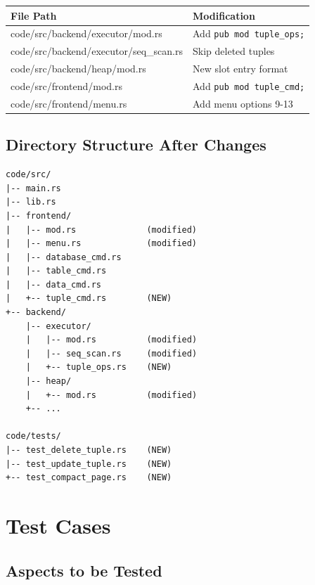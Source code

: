 \documentclass[11pt,a4paper]{article}
\begin{document}
\begin{table}[H]
\centering
\begin{tabular}{@{}ll@{}}
\toprule
\textbf{File Path} & \textbf{Modification} \\
\midrule
code/src/backend/executor/mod.rs & Add \texttt{pub mod tuple\_ops;} \\
code/src/backend/executor/seq\_scan.rs & Skip deleted tuples \\
code/src/backend/heap/mod.rs & New slot entry format \\
code/src/frontend/mod.rs & Add \texttt{pub mod tuple\_cmd;} \\
code/src/frontend/menu.rs & Add menu options 9-13 \\
\bottomrule
\end{tabular}
\end{table}

\subsection{Directory Structure After Changes}

\begin{lstlisting}
code/src/
|-- main.rs
|-- lib.rs
|-- frontend/
|   |-- mod.rs              (modified)
|   |-- menu.rs             (modified)
|   |-- database_cmd.rs
|   |-- table_cmd.rs
|   |-- data_cmd.rs
|   +-- tuple_cmd.rs        (NEW)
+-- backend/
    |-- executor/
    |   |-- mod.rs          (modified)
    |   |-- seq_scan.rs     (modified)
    |   +-- tuple_ops.rs    (NEW)
    |-- heap/
    |   +-- mod.rs          (modified)
    +-- ...

code/tests/
|-- test_delete_tuple.rs    (NEW)
|-- test_update_tuple.rs    (NEW)
+-- test_compact_page.rs    (NEW)
\end{lstlisting}

\section{Test Cases}

\subsection{Aspects to be Tested}
\end{document}
